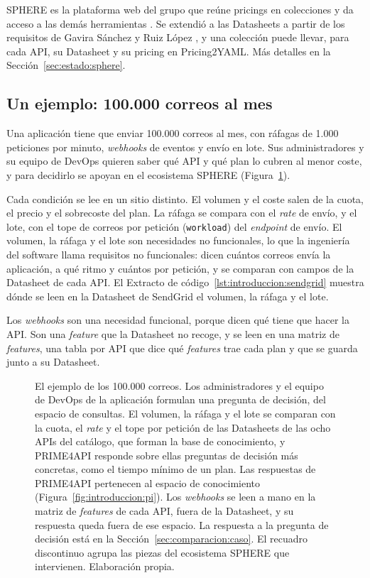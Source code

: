 SPHERE es la plataforma web del grupo que reúne pricings en colecciones y da
acceso a las demás herramientas \citep{sphere}. Se extendió a las Datasheets a
partir de los requisitos de Gavira Sánchez y Ruiz López \citep{gavira2026tfm},
y una colección puede llevar, para cada API, su Datasheet y su pricing en
Pricing2YAML. Más detalles en la Sección~\ref{sec:estado:sphere}.

\subsection{Un ejemplo: 100.000 correos al mes}
\label{subsec:introduccion:ejemplo}

Una aplicación tiene que enviar 100.000 correos al mes, con ráfagas de 1.000
peticiones por minuto, \textit{webhooks} de eventos y envío en lote. Sus
administradores y su equipo de DevOps quieren saber qué API y qué plan lo
cubren al menor coste, y para decidirlo se apoyan en el ecosistema SPHERE
(Figura~\ref{fig:introduccion:ejemplo}).

Cada condición se lee en un sitio distinto. El volumen y el coste salen de la
cuota, el precio y el sobrecoste del plan. La ráfaga se compara con el
\textit{rate} de envío, y el lote, con el tope de correos por petición
(\texttt{workload}) del \textit{endpoint} de envío. El volumen, la ráfaga y
el lote son necesidades no funcionales, lo que la ingeniería del software
llama requisitos no funcionales: dicen cuántos correos envía la aplicación,
a qué ritmo y cuántos por petición, y se comparan con campos de la Datasheet
de cada API. El Extracto de
código~\ref{lst:introduccion:sendgrid} muestra dónde se leen en la Datasheet
de SendGrid el volumen, la ráfaga y el lote.

Los \textit{webhooks} son una necesidad funcional, porque dicen qué tiene
que hacer la API. Son una \textit{feature} que la Datasheet no recoge, y se leen en una
matriz de \textit{features}, una tabla por API que dice qué \textit{features}
trae cada plan y que se guarda junto a su Datasheet.

\begin{figure}[tbp]
\centering

\caption[El ejemplo de los 100.000 correos]{El ejemplo de los 100.000 correos. Los administradores y el equipo de DevOps de la aplicación formulan una pregunta de decisión, del espacio de consultas. El volumen, la ráfaga y el lote se comparan con la cuota, el \textit{rate} y el tope por petición de las Datasheets de las ocho APIs del catálogo, que forman la base de conocimiento, y PRIME4API responde sobre ellas preguntas de decisión más concretas, como el tiempo mínimo de un plan. Las respuestas de PRIME4API pertenecen al espacio de conocimiento (Figura~\ref{fig:introduccion:pi}). Los \textit{webhooks} se leen a mano en la matriz de \textit{features} de cada API, fuera de la Datasheet, y su respuesta queda fuera de ese espacio. La respuesta a la pregunta de decisión está en la Sección~\ref{sec:comparacion:caso}. El recuadro discontinuo agrupa las piezas del ecosistema SPHERE que intervienen. Elaboración propia.}
\label{fig:introduccion:ejemplo}
\end{figure}

